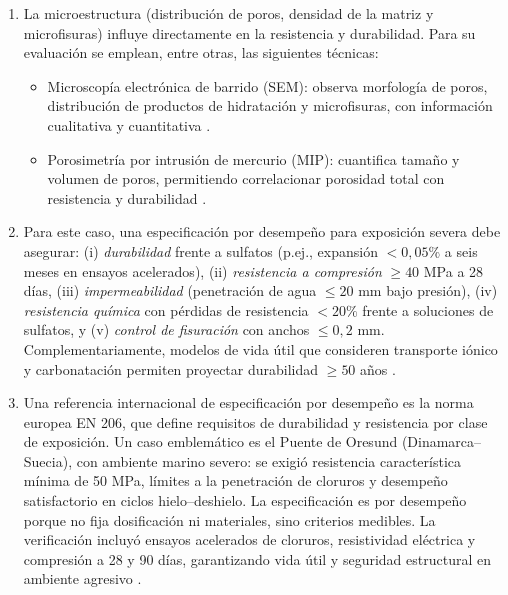 \begin{enumerate}
    \item La microestructura (distribución de poros, densidad de la matriz y microfisuras) influye directamente en la resistencia y durabilidad. Para su evaluación se emplean, entre otras, las siguientes técnicas:
    \begin{itemize}
        \item Microscopía electrónica de barrido (SEM): observa morfología de poros, distribución de productos de hidratación y microfisuras, con información cualitativa y cuantitativa \citep{Diamond1999}.
        \item Porosimetría por intrusión de mercurio (MIP): cuantifica tamaño y volumen de poros, permitiendo correlacionar porosidad total con resistencia y durabilidad \citep{Gallucci2012}.
    \end{itemize}
    
    \item Para este caso, una especificación por desempeño para exposición severa debe asegurar: (i) \textit{durabilidad} frente a sulfatos (p.ej., expansión $<0{,}05\%$ a seis meses en ensayos acelerados), (ii) \textit{resistencia a compresión} $\geq 40$ MPa a 28 días, (iii) \textit{impermeabilidad} (penetración de agua $\leq 20$ mm bajo presión), (iv) \textit{resistencia química} con pérdidas de resistencia $<20\%$ frente a soluciones de sulfatos, y (v) \textit{control de fisuración} con anchos $\leq 0{,}2$ mm. Complementariamente, modelos de vida útil que consideren transporte iónico y carbonatación permiten proyectar durabilidad $\geq 50$ años \citep{NCh170-2016,ConcreteSociety2006}.
    
    \item Una referencia internacional de especificación por desempeño es la norma europea EN 206, que define requisitos de durabilidad y resistencia por clase de exposición. Un caso emblemático es el Puente de Oresund (Dinamarca–Suecia), con ambiente marino severo: se exigió resistencia característica mínima de 50 MPa, límites a la penetración de cloruros y desempeño satisfactorio en ciclos hielo–deshielo. La especificación es por desempeño porque no fija dosificación ni materiales, sino criterios medibles. La verificación incluyó ensayos acelerados de cloruros, resistividad eléctrica y compresión a 28 y 90 días, garantizando vida útil y seguridad estructural en ambiente agresivo \citep{EN206,ConcreteSociety2006}.
\end{enumerate}






